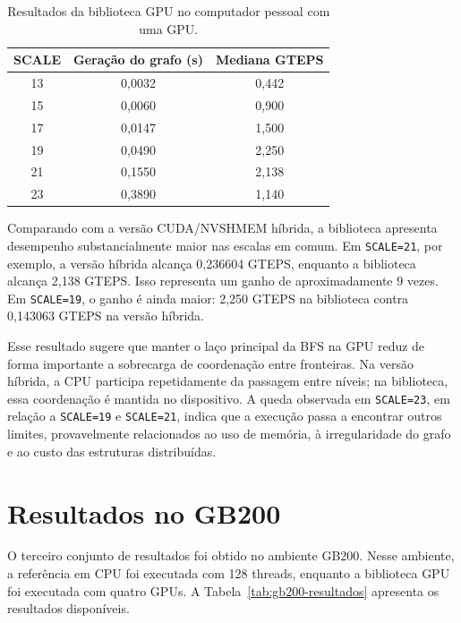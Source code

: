 \begin{table}[H]
\centering
\begin{tabular}{c|c|c}
\hline
SCALE & Geração do grafo (s) & Mediana GTEPS \\
\hline
13 & 0,0032 & 0,442 \\
15 & 0,0060 & 0,900 \\
17 & 0,0147 & 1,500 \\
19 & 0,0490 & 2,250 \\
21 & 0,1550 & 2,138 \\
23 & 0,3890 & 1,140 \\
\hline
\end{tabular}
\caption{Resultados da biblioteca GPU no computador pessoal com uma GPU.}
\label{tab:pc-biblioteca}
\end{table}

Comparando com a versão CUDA/NVSHMEM híbrida, a biblioteca apresenta desempenho
substancialmente maior nas escalas em comum. Em \texttt{SCALE=21}, por exemplo,
a versão híbrida alcança 0,236604 GTEPS, enquanto a biblioteca alcança 2,138
GTEPS. Isso representa um ganho de aproximadamente $9$ vezes. Em
\texttt{SCALE=19}, o ganho é ainda maior: 2,250 GTEPS na biblioteca contra
0,143063 GTEPS na versão híbrida.

Esse resultado sugere que manter o laço principal da BFS na GPU reduz de forma
importante a sobrecarga de coordenação entre fronteiras. Na versão híbrida, a CPU
participa repetidamente da passagem entre níveis; na biblioteca, essa coordenação
é mantida no dispositivo. A queda observada em \texttt{SCALE=23}, em relação a
\texttt{SCALE=19} e \texttt{SCALE=21}, indica que a execução passa a encontrar
outros limites, provavelmente relacionados ao uso de memória, à irregularidade do
grafo e ao custo das estruturas distribuídas.

\section{Resultados no GB200}

O terceiro conjunto de resultados foi obtido no ambiente GB200. Nesse ambiente,
a referência em CPU foi executada com 128 threads, enquanto a biblioteca GPU foi
executada com quatro GPUs. A Tabela~\ref{tab:gb200-resultados} apresenta os
resultados disponíveis.


